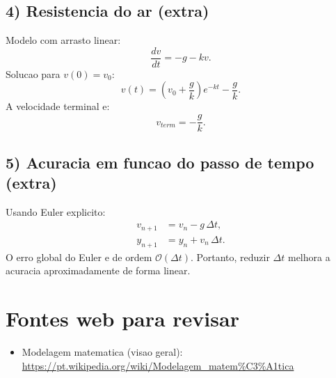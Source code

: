 \documentclass[12pt,a4paper]{article}
\begin{document}
\subsection*{4) Resistencia do ar (extra)}
Modelo com arrasto linear:
\begin{equation}
\frac{dv}{dt} = -g - kv.
\end{equation}
Solucao para $v(0)=v_0$:
\begin{equation}
v(t)=\left(v_0+\frac{g}{k}\right)e^{-kt}-\frac{g}{k}.
\end{equation}
A velocidade terminal e:
\begin{equation}
v_{term}=-\frac{g}{k}.
\end{equation}

\subsection*{5) Acuracia em funcao do passo de tempo (extra)}
Usando Euler explicito:
\begin{align}
v_{n+1} &= v_n - g\,\Delta t, \\
y_{n+1} &= y_n + v_n\,\Delta t.
\end{align}
O erro global do Euler e de ordem $\mathcal{O}(\Delta t)$.
Portanto, reduzir $\Delta t$ melhora a acuracia aproximadamente de forma linear.

\section{Fontes web para revisar}
\begin{itemize}
  \item Modelagem matematica (visao geral): \url{https://pt.wikipedia.org/wiki/Modelagem_matem%C3%A1tica}
\end{itemize}
\end{document}
